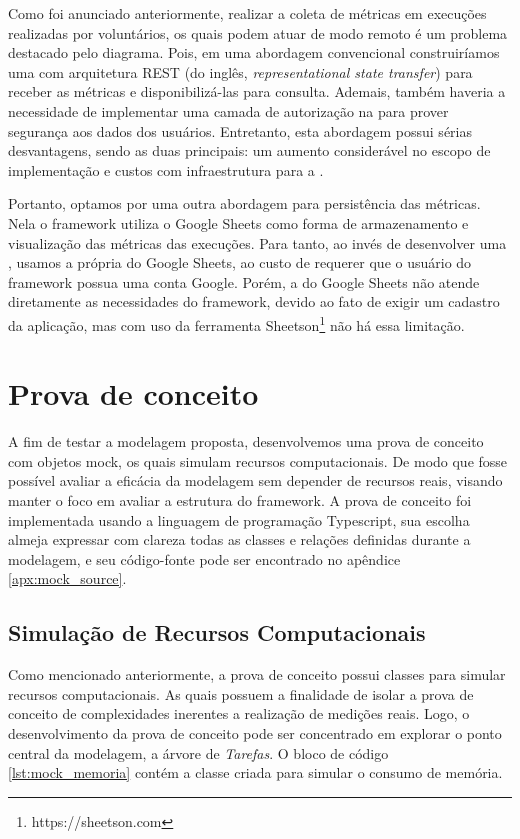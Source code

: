 \documentclass[12pt]{tcc}
\begin{document}
Como foi anunciado anteriormente, realizar a coleta de métricas em execuções realizadas por voluntários, os quais podem atuar de modo remoto é um problema destacado pelo diagrama.
Pois, em uma abordagem convencional construiríamos uma  com arquitetura REST (do inglês, \emph{representational state transfer}) para receber as métricas e disponibilizá-las para consulta.
Ademais, também haveria a necessidade de implementar uma camada de autorização na  para prover segurança aos dados dos usuários.
Entretanto, esta abordagem possui sérias desvantagens, sendo as duas principais: um aumento considerável no escopo de implementação e custos com infraestrutura para a .

Portanto, optamos por uma outra abordagem para persistência das métricas.
Nela o framework utiliza o Google Sheets como forma de armazenamento e visualização das métricas das execuções.
Para tanto, ao invés de desenvolver uma , usamos a própria  do Google Sheets, ao custo de requerer que o usuário do framework possua uma conta Google.
Porém, a  do Google Sheets não atende diretamente as necessidades do framework, devido ao fato de exigir um cadastro da aplicação, mas com uso da ferramenta Sheetson\footnote{https://sheetson.com} não há essa limitação.


\chapter{Prova de conceito}
\label{cap:prova_de_conceito}
A fim de testar a modelagem proposta, desenvolvemos uma prova de conceito com objetos mock, os quais simulam recursos computacionais.
De modo que fosse possível avaliar a eficácia da modelagem sem depender de recursos reais, visando manter o foco em avaliar a estrutura do framework.
A prova de conceito foi implementada usando a linguagem de programação Typescript, sua escolha almeja expressar com clareza todas as classes e relações definidas durante a modelagem, e seu código-fonte pode ser encontrado no apêndice \ref{apx:mock_source}.


\section{Simulação de Recursos Computacionais}
Como mencionado anteriormente, a prova de conceito possui classes para simular recursos computacionais.
As quais possuem a finalidade de isolar a prova de conceito de complexidades inerentes a realização de medições reais.
Logo, o desenvolvimento da prova de conceito pode ser concentrado em explorar o ponto central da modelagem, a árvore de \emph{Tarefas}.
O bloco de código \ref{lst:mock_memoria} contém a classe criada para simular o consumo de memória.
\end{document}
